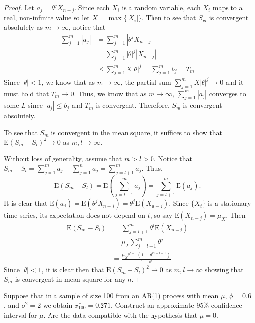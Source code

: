 \documentclass[12pt]{article}
\theoremstyle{definition}
\newenvironment{custompbm}[1]
  {\renewcommand\theproblem{#1}\problem}
  {\endproblem}
\newcommand{\E}{\text{E}}
\begin{document}
\begin{proof}
  Let $a_j = \theta ^ j X_{n-j}$. Since each $X_i$ is a random variable, each $X_i$
  maps to a real, non-infinite value so let $X = \max\{|X_i|\}$. Then to see that $S_m$ is convergent absolutely
  as $m \to \infty$, notice that
  \begin{align*}
    \sum_{j=1}^{m} |a_j|
    &= \sum_{j=1}^{m} |\theta ^ j X_{n-j}| \\
    &= \sum_{j=1}^{m} |\theta| ^ j |X_{n-j}|\\
    &\leq \sum_{j=1}^{m} X|\theta| ^ j = \sum_{j=1}^{m} b_j = T_m
  \end{align*}
  Since $|\theta|<1$, we know that as $m \to \infty$, the partial sum $\sum_{j=1}^m X|\theta|^j \to 0$
  and it must hold that $T_m \to 0$. Thus, we know that as $m \to \infty$, $\sum_{j=1}^{m} |a_j|$ converges to some $L$ since $|a_j| \leq b_j$
  and $T_m$ is convergent. Therefore, $S_m$ is convergent absolutely.

  To see that $S_m$ is convergent in the mean square, it suffices to show that
  $\E(S_m - S_l)^2 \to 0$ as $m, l \to \infty$.

  Without loss of generality, assume that $m > l > 0$. Notice that
  $S_m - S_l = \sum_{j=1}^m a_j - \sum_{j=1}^n a_j = \sum_{j=l+1}^{m} a_j$.
  Thus, $$\E(S_m - S_l) = \E(\sum_{j=l+1}^{m} a_j) = \sum_{j=l+1}^m \E(a_j).$$
  It is clear that $\E(a_j) = \E(\theta^j X_{n-j}) = \theta^j \E(X_{n-j})$. Since
  $\{X_t\}$ is a stationary time series, its expectation does not depend on $t$,
  so say $\E(X_{n-j}) = \mu_X$. Then
  \begin{align*}
    \E(S_m - S_l)
    &= \sum_{j=l+1}^m \theta^j\E(X_{n-j}) \\
    &=\mu_X \sum_{j=l+1}^m \theta^j \\
    &= \frac{\mu_X\theta^{l+1}(1-\theta^{m-l-1})}{1-\theta}
  \end{align*}
  Since $|\theta| < 1$, it is clear then that $\E(S_m - S_l)^2 \to 0$ as $m,l \to \infty$
  showing that $S_m$ is convergent in mean square for any $n$.
\end{proof}


\begin{custompbm}{2.11}
  Suppose that in a sample of size 100 from an AR(1) process with mean $\mu$,
  $\phi=0.6$, and $\sigma^2 = 2$ we obtain $\bar{x_{100}} = 0.271$.
  Construct an approximate 95\% confidence interval for $\mu$. Are the data
  compatible with the hypothesis that $\mu = 0$.
\end{custompbm}
\end{document}
